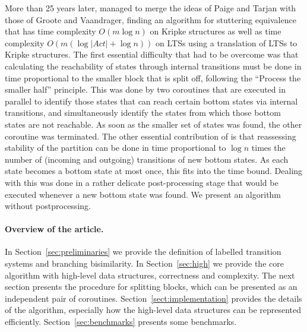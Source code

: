 \documentclass[a4paper,10pt]{article}
\theoremstyle{definition}
\theoremstyle{plain}
\newcommand{\bigo}[1]{{O\!\left(#1\right)}}
\newcommand{\size}[1]{\left\lvert #1 \right\rvert}
\begin{document}
More than 25 years later, \cite{GJKW2017,GrooteW16tacas} managed to merge the ideas of Paige and Tarjan with those of
Groote and Vaandrager, finding an algorithm for stuttering equivalence
that has time complexity $\bigo{m \log n}$ on Kripke structures
as well as time complexity $\bigo{m (\log \size{\mathit{Act}} + \log n)}$ on LTSs using a translation of LTSs to Kripke structures.
The first essential difficulty that had to be overcome was that calculating the reachability
of states through internal transitions must be done in time proportional to the smaller block that is split off, following
the ``Process the smaller half'' principle. This was done by
two coroutines that are executed in parallel to identify those states that can reach certain bottom states
via internal transitions,
and simultaneously identify the states from which those bottom states are not reachable. As soon as the smaller
set of states was found, the other coroutine was terminated.
%
The other essential contribution
of \cite{GJKW2017,GrooteW16tacas} is that reassessing stability
of the partition can be done in time proportional to $\log n$ times the number of (incoming and outgoing) transitions of new bottom states.
As each state becomes a bottom state at most once, this fits into the time bound.
Dealing with this was done in a rather delicate post-processing stage that would be executed whenever a new bottom state
was found.
We present an algorithm without postprocessing.

\paragraph{Overview of the article.}
In Section~\ref{sec:preliminaries} we provide the definition of labelled transition systems and branching bisimilarity.
In Section~\ref{sec:high} we provide the core algorithm with high-level data structures, correctness and complexity.
The next section presents the procedure for splitting blocks,
which can be presented as an independent pair of coroutines.
Section~\ref{sect:implementation} provides the details of the algorithm,
especially how the high-level data structures can be represented efficiently.
Section~\ref{sec:benchmarks} presents some benchmarks.


\end{document}
